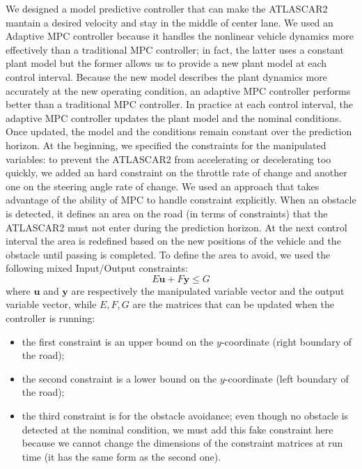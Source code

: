 \documentclass[conference, 11pt]{IEEEtran}
\begin{document}
We designed a model predictive controller that can make the ATLASCAR2 mantain a desired velocity and stay in the middle of center lane. We used an Adaptive MPC controller because it handles the nonlinear vehicle dynamics more effectively than a traditional MPC controller; in fact, the latter uses a constant plant model but the former allows us to provide a new plant model at each control interval. Because the new model describes the plant dynamics more accurately at the new operating condition, an adaptive MPC controller performs better than a traditional MPC controller. In practice at each control interval, the adaptive MPC controller updates the plant model and the nominal conditions. Once updated, the model and the conditions remain constant over the prediction horizon. At the beginning, we specified the constraints for the manipulated variables: to prevent the ATLASCAR2 from accelerating or decelerating too quickly, we added an hard constraint on the throttle rate of change and another one on the steering angle rate of change. We used an approach that takes advantage of the ability of MPC to handle constraint explicitly. When an obstacle is detected, it defines an area on the road (in terms of constraints) that the ATLASCAR2 must not enter during the prediction horizon. At the next control interval the area is redefined based on the new positions of the vehicle and the obstacle until passing is completed.
To define the area to avoid, we used the following mixed Input/Output constraints:
\begin{equation*}
	\label{eqn:mixed_IO_constraints}
	E\textbf{u}+F\textbf{y}\leq G
\end{equation*}
where $\textbf{u}$ and $\textbf{y}$ are respectively the manipulated variable vector and the output variable vector, while $E,F,G$ are the matrices that can be updated when the controller is running:
\begin{itemize}
	\item the first constraint is an upper bound on the $y$-coordinate (right boundary of the road);
	\item the second constraint is a lower bound on the $y$-coordinate (left boundary of the road);
	\item the third constraint is for the obstacle avoidance; even though no obstacle is detected at the nominal condition, we must add this fake constraint here because we cannot change the dimensions of the constraint matrices at run time (it has the same form as the second one).
\end{itemize}
\end{document}

